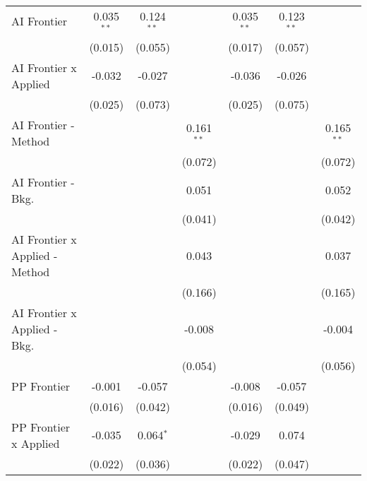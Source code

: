 \begin{tabular}{lcccccc}
   AI Frontier                    & 0.035$^{**}$ & 0.124$^{**}$ &                & 0.035$^{**}$ & 0.123$^{**}$ &   \\   
                                  & (0.015)      & (0.055)      &                & (0.017)      & (0.057)      &   \\   
   AI Frontier x Applied          & -0.032       & -0.027       &                & -0.036       & -0.026       &   \\   
                                  & (0.025)      & (0.073)      &                & (0.025)      & (0.075)      &   \\   
   AI Frontier - Method           &              &              & 0.161$^{**}$   &              &              & 0.165$^{**}$\\   
                                  &              &              & (0.072)        &              &              & (0.072)\\   
   AI Frontier - Bkg.             &              &              & 0.051          &              &              & 0.052\\   
                                  &              &              & (0.041)        &              &              & (0.042)\\   
   AI Frontier x Applied - Method &              &              & 0.043          &              &              & 0.037\\   
                                  &              &              & (0.166)        &              &              & (0.165)\\   
   AI Frontier x Applied - Bkg.   &              &              & -0.008         &              &              & -0.004\\   
                                  &              &              & (0.054)        &              &              & (0.056)\\   
   PP Frontier                    & -0.001       & -0.057       &                & -0.008       & -0.057       &   \\   
                                  & (0.016)      & (0.042)      &                & (0.016)      & (0.049)      &   \\   
   PP Frontier x Applied          & -0.035       & 0.064$^{*}$  &                & -0.029       & 0.074        &   \\   
                                  & (0.022)      & (0.036)      &                & (0.022)      & (0.047)      &   \\   

\end{tabular}
